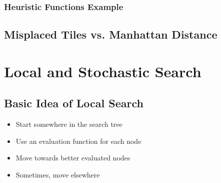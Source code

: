 \documentclass[conference, a4paper]{styles/acmsiggraph}
\begin{document}
        \subsubsection{Heuristic Functions Example}
    \subsection{Misplaced Tiles vs. Manhattan Distance}
    
        
        
        
        
        
        
        
        
\section{Local and Stochastic Search}
    
    \subsection{Basic Idea of Local Search}
        \begin{itemize}
            \item Start somewhere in the search tree
            \item Use an evaluation function for each node
            \item Move towards better evaluated nodes
            \item Sometimes, move elsewhere
        \end{itemize}
    
    
\end{document}
